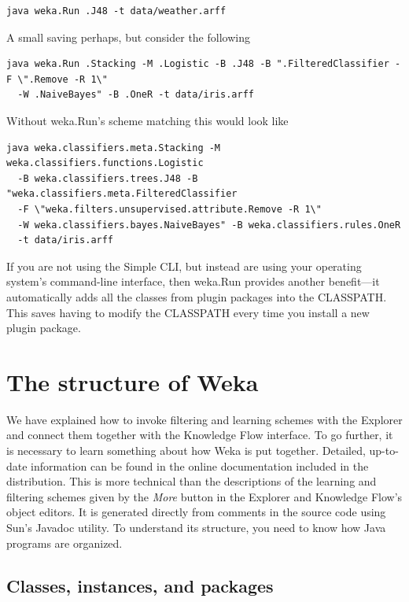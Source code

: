 \begin{Verbatim}[fontsize=\footnotesize]
java weka.Run .J48 -t data/weather.arff
\end{Verbatim}

\noindent A small saving perhaps, but consider the following

\begin{Verbatim}[fontsize=\footnotesize]
java weka.Run .Stacking -M .Logistic -B .J48 -B ".FilteredClassifier -F \".Remove -R 1\" 
  -W .NaiveBayes" -B .OneR -t data/iris.arff
\end{Verbatim}

\noindent Without weka.Run's scheme matching this would look like

\begin{Verbatim}[fontsize=\footnotesize]
java weka.classifiers.meta.Stacking -M weka.classifiers.functions.Logistic 
  -B weka.classifiers.trees.J48 -B "weka.classifiers.meta.FilteredClassifier 
  -F \"weka.filters.unsupervised.attribute.Remove -R 1\" 
  -W weka.classifiers.bayes.NaiveBayes" -B weka.classifiers.rules.OneR 
  -t data/iris.arff
\end{Verbatim}

\noindent If you are not using the Simple CLI, but instead are using
your operating system's command-line interface, then weka.Run provides
another benefit---it automatically adds all the classes from plugin
packages into the CLASSPATH. This saves having to modify the CLASSPATH
every time you install a new plugin package.

\section{The structure of Weka}

We have explained how to invoke filtering and learning schemes with
the Explorer and connect them together with the Knowledge Flow
interface. To go further, it is necessary to learn something about how
Weka is put together. Detailed, up-to-date information can be found in
the online documentation included in the distribution. This is more
technical than the descriptions of the learning and filtering schemes
given by the \textit{More} button in the Explorer and Knowledge Flow's
object editors. It is generated directly from comments in the source
code using Sun’s Javadoc utility. To understand its structure, you
need to know how Java programs are organized.

\subsection{Classes, instances, and packages}

